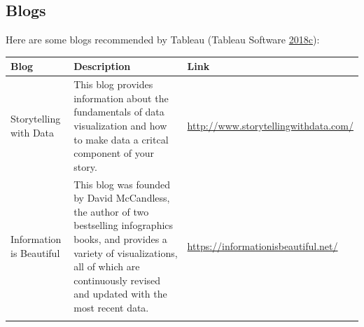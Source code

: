 \documentclass[]{book}
\begin{document}
\subsection{Blogs}\label{blogs}

Here are some blogs recommended by Tableau (Tableau Software
\protect\hyperlink{ref-Top_10_Blogs}{2018}\protect\hyperlink{ref-Top_10_Blogs}{c}):

\begin{longtable}[]{@{}lll@{}}
\toprule
\begin{minipage}[b]{0.11\columnwidth}\raggedright\strut
\textbf{Blog}\strut
\end{minipage} & \begin{minipage}[b]{0.20\columnwidth}\raggedright\strut
\textbf{Description}\strut
\end{minipage} & \begin{minipage}[b]{0.11\columnwidth}\raggedright\strut
\textbf{Link}\strut
\end{minipage}\tabularnewline
\midrule
\endhead
\begin{minipage}[t]{0.11\columnwidth}\raggedright\strut
Storytelling with Data\strut
\end{minipage} & \begin{minipage}[t]{0.20\columnwidth}\raggedright\strut
This blog provides information about the fundamentals of data
visualization and how to make data a critcal component of your
story.\strut
\end{minipage} & \begin{minipage}[t]{0.11\columnwidth}\raggedright\strut
\url{http://www.storytellingwithdata.com/}\strut
\end{minipage}\tabularnewline
\begin{minipage}[t]{0.11\columnwidth}\raggedright\strut
Information is Beautiful\strut
\end{minipage} & \begin{minipage}[t]{0.20\columnwidth}\raggedright\strut
This blog was founded by David McCandless, the author of two bestselling
infographics books, and provides a variety of visualizations, all of
which are continuously revised and updated with the most recent
data.\strut
\end{minipage} & \begin{minipage}[t]{0.11\columnwidth}\raggedright\strut
\url{https://informationisbeautiful.net/}\strut
\end{minipage}\tabularnewline
\begin{minipage}[t]{0.11\columnwidth}\raggedright\strut

\end{minipage}
\end{longtable}
\end{document}
